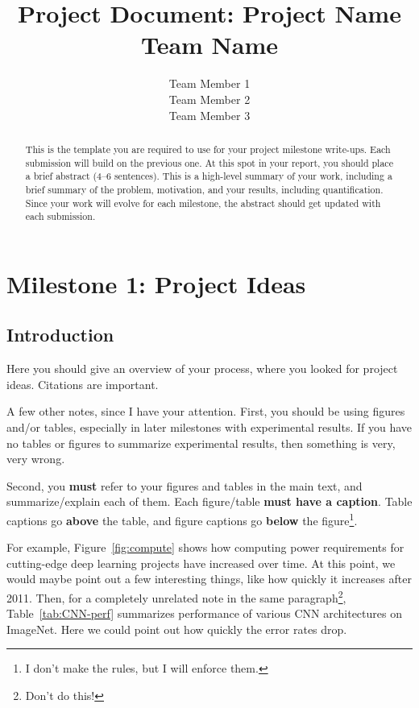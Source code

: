\documentclass{report}
\title{Project Document: Project Name \\ Team Name}
\author{Team Member 1 \\
Team Member 2 \\
Team Member 3 }
\date{}
\begin{document}
\maketitle

\tableofcontents

\begin{abstract}
This is the template you are required to use for your project milestone write-ups.  Each submission will build on the previous one.  At this spot in your report, you should place a brief abstract (4--6 sentences). This is a high-level summary of your work, including a brief summary of the problem, motivation, and your results, including quantification.  Since your work will evolve for each milestone, the abstract should get updated with each submission.
\end{abstract}

\chapter{Milestone 1: Project Ideas}

\section{Introduction}

Here you should give an 
overview of your process, where you looked for project ideas. Citations are important. 

A few other notes, since I have your attention. First, you should be using figures and/or tables, especially in later milestones with experimental results.  If you have no tables or figures to summarize experimental results, then something is very, very wrong. 

Second, you {\bf must} refer to your figures and tables in the main text, and summarize/explain each of  them.  Each figure/table {\bf must have a caption}.  Table captions go {\bf above} the table, and figure captions go {\bf below} the figure\footnote{I don't make the rules, but I will enforce them.}. 

For example, Figure~\ref{fig:compute} shows how computing power requirements for cutting-edge deep learning projects have increased over time. At this point, we would maybe point out a few interesting things, like how quickly it increases after 2011. Then, for a completely unrelated note in the same paragraph\footnote{Don't do this!}, Table~\ref{tab:CNN-perf} summarizes  performance of various CNN architectures on ImageNet.  Here we could point out how quickly the error rates drop. 
\end{document}
